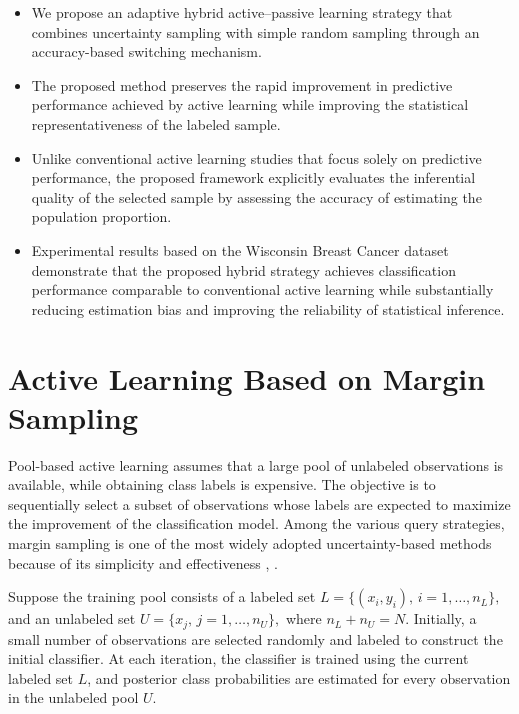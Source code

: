 \documentclass[twoside]{article}
\begin{document}
\begin{itemize}
\item We propose an adaptive hybrid active--passive learning strategy that combines uncertainty sampling with simple random sampling through an accuracy-based switching mechanism.

\item The proposed method preserves the rapid improvement in predictive performance achieved by active learning while improving the statistical representativeness of the labeled sample.

\item Unlike conventional active learning studies that focus solely on predictive performance, the proposed framework explicitly evaluates the inferential quality of the selected sample by assessing the accuracy of estimating the population proportion.

\item Experimental results based on the Wisconsin Breast Cancer dataset demonstrate that the proposed hybrid strategy achieves classification performance comparable to conventional active learning while substantially reducing estimation bias and improving the reliability of statistical inference.
\end{itemize}

\section{Active Learning Based on Margin Sampling}
Pool-based active learning assumes that a large pool of unlabeled observations is available, while obtaining class labels is expensive. The objective is to sequentially select a subset of observations whose labels are expected to maximize the improvement of the classification model. Among the various query strategies, margin sampling is one of the most widely adopted uncertainty-based methods because of its simplicity and effectiveness \cite{Settles2009}, \cite{Tong2001}.

Suppose the training pool consists of a labeled set
$
 L=\{(x_i,y_i),\,i=1,\ldots,n_L\}, 
$
and an unlabeled set
$
U=\{x_j,\,j=1,\ldots,n_U\}, 
$
where $n_L + n_U = N$. Initially, a small number of observations are selected randomly and labeled to construct the initial classifier. At each iteration, the classifier is trained using the current labeled set $L$, and posterior class probabilities are estimated for every observation in the unlabeled pool $U$.
\end{document}
